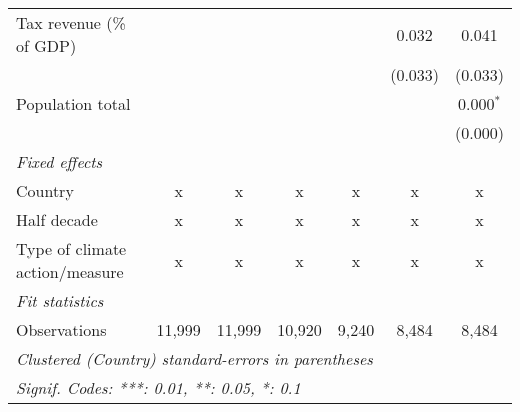 \begin{tabular}{lcccccc}
   Tax revenue (\% of GDP)                                  &         &         &             &             & 0.032   & 0.041\\   
                                                            &         &         &             &             & (0.033) & (0.033)\\   
   Population total                                         &         &         &             &             &         & 0.000$^{*}$\\   
                                                            &         &         &             &             &         & (0.000)\\   
   \emph{Fixed effects}\\
   Country                                                  & x       & x       & x           & x           & x       & x\\  
   Half decade                                              & x       & x       & x           & x           & x       & x\\  
   Type of climate action/measure                           & x       & x       & x           & x           & x       & x\\  
   \midrule \emph{Fit statistics}\\
   Observations                                             & 11,999  & 11,999  & 10,920      & 9,240       & 8,484   & 8,484\\  
   \midrule
   \multicolumn{7}{l}{\emph{Clustered (Country) standard-errors in parentheses}}\\
   \multicolumn{7}{l}{\emph{Signif. Codes: ***: 0.01, **: 0.05, *: 0.1}}\\
\end{tabular}
\par\endgroup


